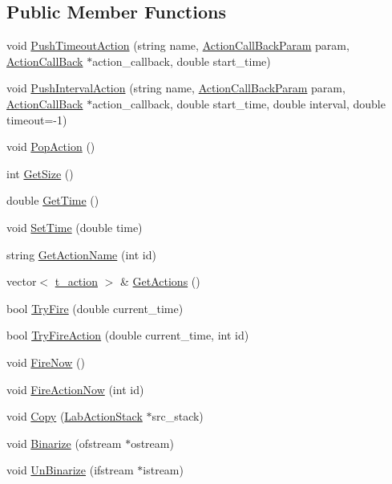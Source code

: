 \subsection*{Public Member Functions}
\begin{DoxyCompactItemize}
\item 
void \hyperlink{classelps_1_1_lab_action_stack_a8ae2fb5ea16320aeb6dd5c8910d8cb3d}{Push\+Timeout\+Action} (string name, \hyperlink{namespaceelps_a25715773cecbf210efb08dff37b7b013}{Action\+Call\+Back\+Param} param, \hyperlink{namespaceelps_aa1ee9bc57556d61c2b7534818c6d5889}{Action\+Call\+Back} $\ast$action\+\_\+callback, double start\+\_\+time)
\item 
void \hyperlink{classelps_1_1_lab_action_stack_a45fe60594dfa9b74e2746c9b40a47260}{Push\+Interval\+Action} (string name, \hyperlink{namespaceelps_a25715773cecbf210efb08dff37b7b013}{Action\+Call\+Back\+Param} param, \hyperlink{namespaceelps_aa1ee9bc57556d61c2b7534818c6d5889}{Action\+Call\+Back} $\ast$action\+\_\+callback, double start\+\_\+time, double interval, double timeout=-\/1)
\item 
void \hyperlink{classelps_1_1_lab_action_stack_af8be0d6bfb67e1f55473deca832d1c09}{Pop\+Action} ()
\item 
int \hyperlink{classelps_1_1_lab_action_stack_ab104c5d4cf79083d8fb22c0d7de19207}{Get\+Size} ()
\item 
double \hyperlink{classelps_1_1_lab_action_stack_a08c9abd10667fcd039c0b1f49cf52975}{Get\+Time} ()
\item 
void \hyperlink{classelps_1_1_lab_action_stack_a5bfe16949a6ca81fa5e27701fffaf8e4}{Set\+Time} (double time)
\item 
string \hyperlink{classelps_1_1_lab_action_stack_a0d889a8f21b5809134dea1e2a8158518}{Get\+Action\+Name} (int id)
\item 
vector$<$ \hyperlink{structelps_1_1_lab_action_stack_1_1t__action}{t\+\_\+action} $>$ \& \hyperlink{classelps_1_1_lab_action_stack_aa0256ee51ed4e231c70fde3930513964}{Get\+Actions} ()
\item 
bool \hyperlink{classelps_1_1_lab_action_stack_a639ffa50c74766caa54f8bd243707bf3}{Try\+Fire} (double current\+\_\+time)
\item 
bool \hyperlink{classelps_1_1_lab_action_stack_a256a36fd87b65c46f3358537517d1214}{Try\+Fire\+Action} (double current\+\_\+time, int id)
\item 
void \hyperlink{classelps_1_1_lab_action_stack_a4ed5c6b07c5e105fe668afa545012fec}{Fire\+Now} ()
\item 
void \hyperlink{classelps_1_1_lab_action_stack_ac19a4860a13ee0e40d33f57d5cb19e42}{Fire\+Action\+Now} (int id)
\item 
void \hyperlink{classelps_1_1_lab_action_stack_aca1618b9f704080a2adfa506bd2d09a9}{Copy} (\hyperlink{classelps_1_1_lab_action_stack}{Lab\+Action\+Stack} $\ast$src\+\_\+stack)
\item 
void \hyperlink{classelps_1_1_lab_action_stack_ae6608e50b77c7af7047f161f20c59d03}{Binarize} (ofstream $\ast$ostream)
\item 
void \hyperlink{classelps_1_1_lab_action_stack_ae523bf40512050cde98f35acc9292bfc}{Un\+Binarize} (ifstream $\ast$istream)
\end{DoxyCompactItemize}


